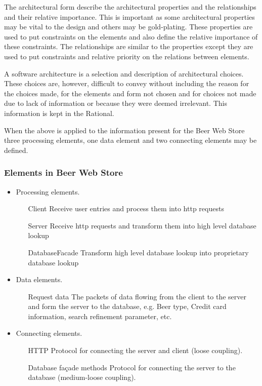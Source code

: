 The architectural form describe the architectural properties and the relationships and their relative importance. This is important as some architectural properties may be vital to the design and others may be gold-plating. These properties are used to put constraints on the elements and also define the relative importance of these constraints. The relationships are similar to the properties except they are used to put constraints and relative priority on the relations between elements.

A software architecture is a selection and description of architectural choices. These choices are, however, difficult to convey without including the reason for the choices made, for the elements and form not chosen and for choices not made due to lack of information or because they were deemed irrelevant. This information is kept in the Rational.

When the above is applied to the information present for the Beer Web Store three processing elements, one data element and two connecting elements may be defined.

\subsubsection{Elements in Beer Web Store}

\begin{itemize}
    \item Processing elements.
	 \begin{itemize}
	    \item[Client] Receive user entries and process them into http requests
	    \item[Server] Receive http requests and transform them into high level database lookup
	    \item[DatabaseFacade] Transform high level database lookup into proprietary database lookup
	 \end{itemize}
    \item Data elements.
	 \begin{itemize}
	    \item[Request data] The packets of data flowing from the client to the server and form the server to the database, e.g. Beer type, Credit card information, search refinement parameter, etc.
	 \end{itemize}
    \item Connecting elements.
	 \begin{itemize}
	    \item[HTTP] Protocol for connecting the server and client (loose coupling).
	    \item[Database fa\c cade methods] Protocol for connecting the server to the database (medium-loose coupling).
	 \end{itemize}
\end{itemize}

